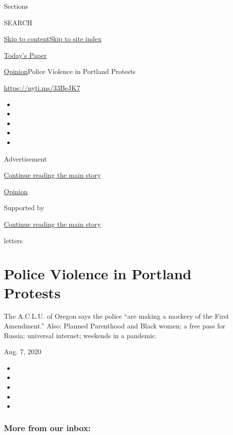 Sections

SEARCH

\protect\hyperlink{site-content}{Skip to
content}\protect\hyperlink{site-index}{Skip to site index}

\href{https://myaccount.nytimes.com/auth/login?response_type=cookie\&client_id=vi}{}

\href{https://www.nytimes.com/section/todayspaper}{Today's Paper}

\href{/section/opinion}{Opinion}\textbar{}Police Violence in Portland
Protests

\href{https://nyti.ms/33BeJK7}{https://nyti.ms/33BeJK7}

\begin{itemize}
\item
\item
\item
\item
\item
\end{itemize}

Advertisement

\protect\hyperlink{after-top}{Continue reading the main story}

\href{/section/opinion}{Opinion}

Supported by

\protect\hyperlink{after-sponsor}{Continue reading the main story}

letters

\hypertarget{police-violence-in-portland-protests}{%
\section{Police Violence in Portland
Protests}\label{police-violence-in-portland-protests}}

The A.C.L.U. of Oregon says the police ``are making a mockery of the
First Amendment.'' Also: Planned Parenthood and Black women; a free pass
for Russia; universal internet; weekends in a pandemic.

Aug. 7, 2020

\begin{itemize}
\item
\item
\item
\item
\item
\end{itemize}

\hypertarget{more-from-our-inbox}{%
\subsubsection{More from our inbox:}\label{more-from-our-inbox}}

